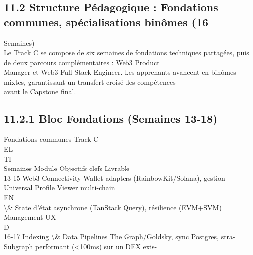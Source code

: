 \subsection{11.2 Structure Pédagogique : Fondations communes, spécialisations binômes (16}
Semaines)\\
Le Track C se compose de six semaines de fondations techniques partagées, puis de deux parcours complémentaires : Web3 Product\\
Manager et Web3 Full-Stack Engineer. Les apprenants avancent en binômes mixtes, garantissant un transfert croisé des compétences\\
avant le Capstone final.\\
\vspace{0.5em}
\vspace{0.5em}
\subsection{11.2.1 Bloc Fondations (Semaines 13-18)}
\vspace{0.5em}
Fondations communes Track C\\
\vspace{0.5em}
\vspace{0.5em}
\vspace{0.5em}
\vspace{0.5em}
EL\\
TI\\
Semaines Module                     Objectifs clefs                                Livrable\\
13-15     Web3 Connectivity Wallet adapters (RainbowKit/Solana), gestion Universal   Profile              Viewer      multi-chain\\
\vspace{0.5em}
\vspace{0.5em}
\vspace{0.5em}
\vspace{0.5em}
EN\\
\textbackslash{}& State           d’état asynchrone (TanStack Query), résilience (EVM+SVM)\\
Management        UX\\
\vspace{0.5em}
\vspace{0.5em}
\vspace{0.5em}
\vspace{0.5em}
D\\
16-17     Indexing \textbackslash{}& Data         Pipelines The Graph/Goldsky, sync Postgres, stra- Subgraph performant (\textless{}100ms) sur un DEX exis-\\
